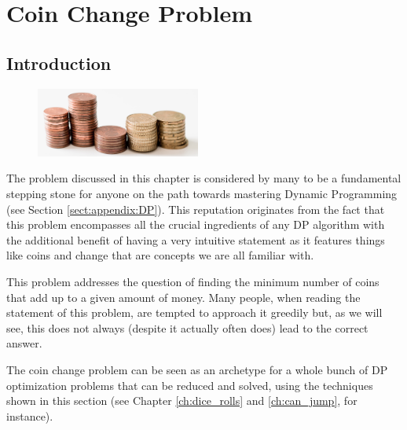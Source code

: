 %

\chapter{Coin Change Problem}
\label{ch:coin_change}
\section*{Introduction}

\begin{figure}
    \vspace{-20pt}
    \begin{center}
        \includegraphics[width=0.48\textwidth]{sources/coin_change/images/coin_stacks}
    \end{center}
    \vspace{-15pt}
  \end{figure}
The problem discussed in this chapter is considered by many to be a fundamental stepping stone for anyone on the path towards mastering Dynamic Programming (see Section \ref{sect:appendix:DP}).
This reputation originates from the fact that this problem encompasses all the crucial ingredients of any DP algorithm with the additional benefit of having a very intuitive statement as 
it features things like coins and change that are concepts we are all familiar with.

This problem addresses the question of finding the minimum number of coins that add up to a given amount of money. 
Many people, when reading the statement of this problem, are tempted to approach it greedily but, as we will see, this does not always (despite it actually often does) lead to the correct answer. 

The coin change problem can be seen as an archetype for a whole bunch of DP optimization problems that can be reduced and solved, using the techniques shown in this section (see Chapter \ref{ch:dice_rolls} and \ref{ch:can_jump}, for instance).

